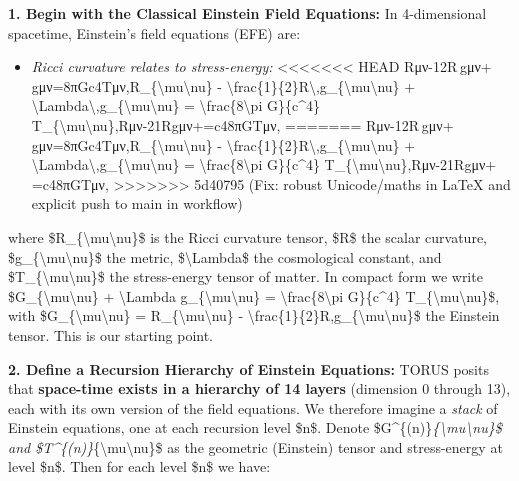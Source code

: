 \documentclass[]{article}
\begin{document}
\textbf{1. Begin with the Classical Einstein Field Equations:} In
4-dimensional spacetime, Einstein's field equations (EFE) are:

\begin{itemize}
\item
  \emph{Ricci curvature relates to stress-energy:}
<<<<<<< HEAD
  Rμν-12R gμν+\Lambda gμν=8πGc4Tμν,R\_\{\textbackslash mu\textbackslash nu\} -
  \textbackslash frac\{1\}\{2\}R\textbackslash,g\_\{\textbackslash mu\textbackslash nu\}
  +
  \textbackslash Lambda\textbackslash,g\_\{\textbackslash mu\textbackslash nu\}
  = \textbackslash frac\{8\textbackslash pi G\}\{c\^{}4\}
  T\_\{\textbackslash mu\textbackslash nu\},Rμν\hspace{0pt}-21\hspace{0pt}Rgμν\hspace{0pt}+\hspace{0pt}=c48πG\hspace{0pt}Tμν\hspace{0pt},
=======
  Rμν-12R gμν+\Lambda gμν=8πGc4Tμν,R\_\{\textbackslash{}mu\textbackslash{}nu\}
  -
  \textbackslash{}frac\{1\}\{2\}R\textbackslash{},g\_\{\textbackslash{}mu\textbackslash{}nu\}
  +
  \textbackslash{}Lambda\textbackslash{},g\_\{\textbackslash{}mu\textbackslash{}nu\}
  = \textbackslash{}frac\{8\textbackslash{}pi G\}\{c\^{}4\}
  T\_\{\textbackslash{}mu\textbackslash{}nu\},Rμν​-21​Rgμν​+​=c48πG​Tμν​,
>>>>>>> 5d40795 (Fix: robust Unicode/maths in LaTeX and explicit push to main in workflow)
\end{itemize}

where \$R\_\{\textbackslash{}mu\textbackslash{}nu\}\$ is the Ricci
curvature tensor, \$R\$ the scalar curvature,
\$g\_\{\textbackslash{}mu\textbackslash{}nu\}\$ the metric,
\$\textbackslash{}Lambda\$ the cosmological constant, and
\$T\_\{\textbackslash{}mu\textbackslash{}nu\}\$ the stress-energy tensor
of matter. In compact form we write
\$G\_\{\textbackslash{}mu\textbackslash{}nu\} + \textbackslash{}Lambda
g\_\{\textbackslash{}mu\textbackslash{}nu\} =
\textbackslash{}frac\{8\textbackslash{}pi G\}\{c\^{}4\}
T\_\{\textbackslash{}mu\textbackslash{}nu\}\$, with
\$G\_\{\textbackslash{}mu\textbackslash{}nu\} =
R\_\{\textbackslash{}mu\textbackslash{}nu\} -
\textbackslash{}frac\{1\}\{2\}R,g\_\{\textbackslash{}mu\textbackslash{}nu\}\$
the Einstein tensor. This is our starting point​.

\textbf{2. Define a Recursion Hierarchy of Einstein Equations:} TORUS
posits that \textbf{space-time exists in a hierarchy of 14 layers}
(dimension 0 through 13), each with its own version of the field
equations​. We therefore imagine a \emph{stack} of Einstein equations,
one at each recursion level \$n\$. Denote
\$G\^{}\{(n)\}\emph{\{\textbackslash{}mu\textbackslash{}nu\}\$ and
\$T\^{}\{(n)\}}\{\textbackslash{}mu\textbackslash{}nu\}\$ as the
geometric (Einstein) tensor and stress-energy at level \$n\$. Then for
each level \$n\$ we have:
\end{document}
